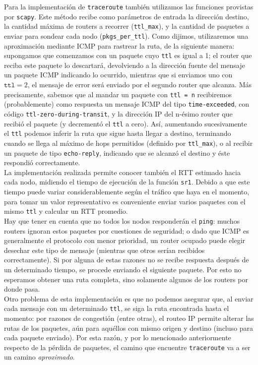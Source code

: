  Para la implementaci\'on de \texttt{traceroute} también utilizamos las funciones provistas por \texttt{scapy}. Este m\'etodo recibe como par\'ametros de entrada la direcci\'on destino, la cantidad m\'axima de routers a recorrer (\texttt{ttl\_max}), y la cantidad de paquetes a enviar para sondear cada nodo (\texttt{pkgs\_per\_ttl}). Como dijimos, utilizaremos una aproximación mediante ICMP para rastrear la ruta, de la siguiente manera: supongamos que comenzamos con un paquete cuyo \texttt{ttl} es igual a 1; el router que reciba este paquete lo descartará, devolviendo a la direcci\'on fuente del mensaje un paquete ICMP indicando lo ocurrido, mientras que si enviamos uno con $\texttt{ttl} = 2$, el mensaje de error será enviado por el segundo router que alcanza. M\'as precisamente, sabemos que al mandar un paquete con \texttt{ttl = n} recibiremos (probablemente) como respuesta un mensaje ICMP del tipo \texttt{time-exceeded}, con c\'odigo \texttt{ttl-zero-during-transit}, y la direcci\'on IP del n-ésimo router 
que recibió el paquete (y decrement\'o el \texttt{ttl} a cero). Así, aumentando sucesivamente el \texttt{ttl}  podemos inferir la ruta que sigue hasta llegar a destino, terminando cuando se llega al m\'aximo de hops permitidos (definido por \texttt{ttl\_max}), o al recibir un paquete de tipo \texttt{echo-reply}, indicando que se alcanzó el destino y éste respondi\'o correctamente.\\

La implementaci\'on realizada permite conocer tambi\'en el RTT estimado hacia cada nodo, midiendo el tiempo de ejecuci\'on de la funci\'on \texttt{sr1}. Debido a que este tiempo puede variar considerablemente seg\'un el tr\'afico que haya en el momento, para tomar un valor representativo es conveniente enviar varios paquetes con el mismo \texttt{ttl} y calcular un RTT promedio.\\
 
 Hay que tener en cuenta que no todos los nodos responderán el \texttt{ping}: muchos routers ignoran estos paquetes por cuestiones de seguridad; o dado que ICMP es generalmente el protocolo con menor prioridad, un router ocupado puede elegir desechar este tipo de mensaje (mientras que otros ser\'ian recibidos correctamente). Si por alguna de estas razones no se recibe respuesta después de un determinado tiempo, se procede enviando el siguiente paquete. Por esto no esperamos obtener una ruta completa, sino solamente algunos de los routers por donde pasa.\\
 
 Otro problema de esta implementaci\'on es que no podemos asegurar que, al enviar cada mensaje con un determinado \texttt{ttl}, se siga la ruta encontrada hasta el momento: por razones de congesti\'on (entre otras), el routeo IP permite alterar las rutas de los paquetes, aún para aquéllos con mismo origen y destino (incluso para cada paquete enviado). Por esta raz\'on, y por lo mencionado anteriormente respecto de la p\'erdida de paquetes, el camino que encuentre \texttt{traceroute} va a ser un camino \emph{aproximado}. \\
 
